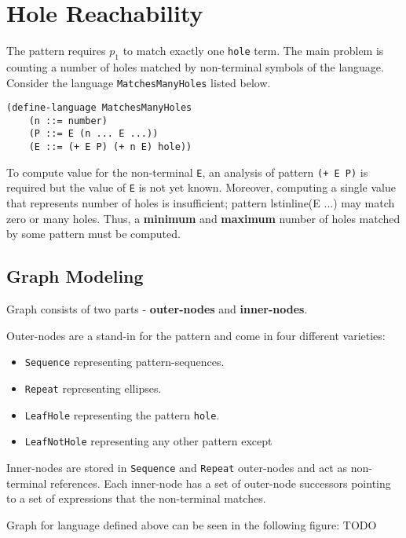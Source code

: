 \section{Hole Reachability}

The pattern \InHolePattern requires $p_1$ to match exactly one \lstinline{hole} term. The main problem is counting a number of holes matched by non-terminal symbols of the language. Consider the language \lstinline{MatchesManyHoles} listed below.

\begin{lstlisting}
(define-language MatchesManyHoles
	(n ::= number)
	(P ::= E (n ... E ...))
	(E ::= (+ E P) (+ n E) hole))
\end{lstlisting}

To compute value for  the non-terminal \lstinline{E}, an analysis of pattern \lstinline{(+ E P)} is required but the value of \lstinline{E} is not yet known. Moreover, computing a single value that represents number of holes is insufficient; pattern lstinline{(E ...)} may match zero or many holes. Thus, a \textbf{minimum} and \textbf{maximum} number of holes matched by some pattern must be computed.

\subsection{Graph Modeling}

Graph consists of two parts - \textbf{outer-nodes} and \textbf{inner-nodes}.

Outer-nodes are a stand-in for the pattern and come in four different varieties:

\begin{itemize}
\item \lstinline{Sequence} representing pattern-sequences.
\item \lstinline{Repeat} representing ellipses.
\item \lstinline{LeafHole} representing the pattern \lstinline{hole}.
\item \lstinline{LeafNotHole} representing any other pattern except \InHolePattern
\end{itemize}

Inner-nodes are stored in \lstinline{Sequence} and \lstinline{Repeat} outer-nodes and act as non-terminal references. Each inner-node has a set of outer-node successors pointing to a set of expressions that the non-terminal matches.

Graph for language defined above can be seen in the following figure:
TODO


